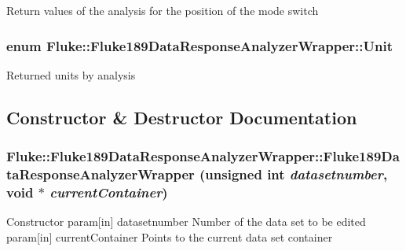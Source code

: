 \label{classFluke_1_1Fluke189DataResponseAnalyzerWrapper_a2ec2700a6086ae0ebd9601fe0c0f957a}
Return values of the analysis for the position of the mode switch \hypertarget{classFluke_1_1Fluke189DataResponseAnalyzerWrapper_ab8e5f2306e4d2ad3d741d273793aaed1}{
\subsubsection[{Unit}]{\setlength{\rightskip}{0pt plus 5cm}enum {\bf Fluke::Fluke189DataResponseAnalyzerWrapper::Unit}}}
\label{classFluke_1_1Fluke189DataResponseAnalyzerWrapper_ab8e5f2306e4d2ad3d741d273793aaed1}
Returned units by analysis 

\subsection{Constructor \& Destructor Documentation}
\hypertarget{classFluke_1_1Fluke189DataResponseAnalyzerWrapper_af4f891231353edf2c9a20743d3018b1e}{
\subsubsection[{Fluke189DataResponseAnalyzerWrapper}]{\setlength{\rightskip}{0pt plus 5cm}Fluke::Fluke189DataResponseAnalyzerWrapper::Fluke189DataResponseAnalyzerWrapper (unsigned int {\em datasetnumber}, \/  void $\ast$ {\em currentContainer})}}
\label{classFluke_1_1Fluke189DataResponseAnalyzerWrapper_af4f891231353edf2c9a20743d3018b1e}
Constructor param\mbox{[}in\mbox{]} datasetnumber Number of the data set to be edited param\mbox{[}in\mbox{]} currentContainer Points to the current data set container 


